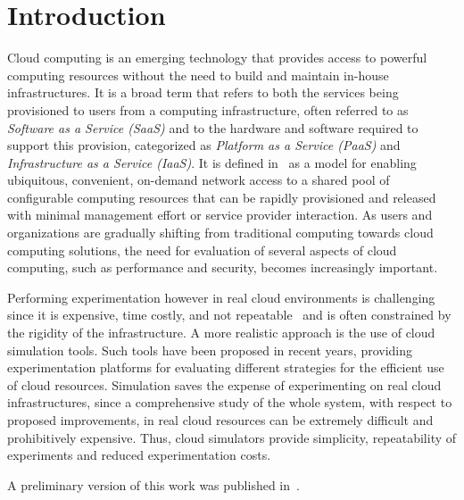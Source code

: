 \section{Introduction}


Cloud computing is an emerging technology that provides access to powerful computing resources without the need to build and maintain in-house infrastructures. It is a broad term that refers to both the services being provisioned to users from a computing infrastructure, often referred to as \textit{Software as a Service (SaaS)} and to the hardware and software required to support this provision, categorized as \textit{Platform as a Service (PaaS)} and \textit{Infrastructure as a Service (IaaS)}. It is defined in~\cite{mell2011nist} as a model for enabling ubiquitous, convenient, on-demand network access to a shared pool of configurable computing resources that can be rapidly provisioned and released with minimal management effort or service provider interaction. As users and organizations are gradually shifting from traditional computing towards cloud computing solutions, the need for evaluation of several aspects of cloud computing, such as performance and security, becomes increasingly important.

Performing experimentation however in real cloud environments is challenging since it is expensive, time costly, and not repeatable~\cite{calheiros2013emusim} and is often constrained by the rigidity of the infrastructure. A more realistic approach is the use of cloud simulation tools. Such tools have been proposed in recent years, providing experimentation platforms for evaluating different strategies for the efficient use of cloud resources. Simulation saves the expense of experimenting on real cloud infrastructures, since a comprehensive study of the whole system, with respect to proposed improvements, in real cloud resources can be extremely difficult and prohibitively expensive. Thus, cloud simulators provide simplicity, repeatability of experiments and reduced experimentation costs.

A preliminary version of this work was published in~\cite{filelis2017}.